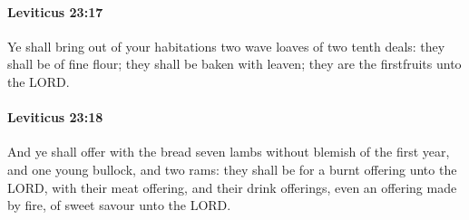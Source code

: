 		\paragraph{Leviticus 23:17} %
			\label{LEVITICUS-23-17}

			Ye shall bring out of your habitations two wave loaves of two tenth deals: they shall be of fine flour; they shall be baken with leaven; they are the firstfruits unto the LORD.


		\paragraph{Leviticus 23:18} %
			\label{LEVITICUS-23-18}

			And ye shall offer with the bread seven lambs without blemish of the first year, and one young bullock, and two rams: they shall be for a burnt offering unto the LORD, with their meat offering, and their drink offerings, even an offering made by fire, of sweet savour unto the LORD.

